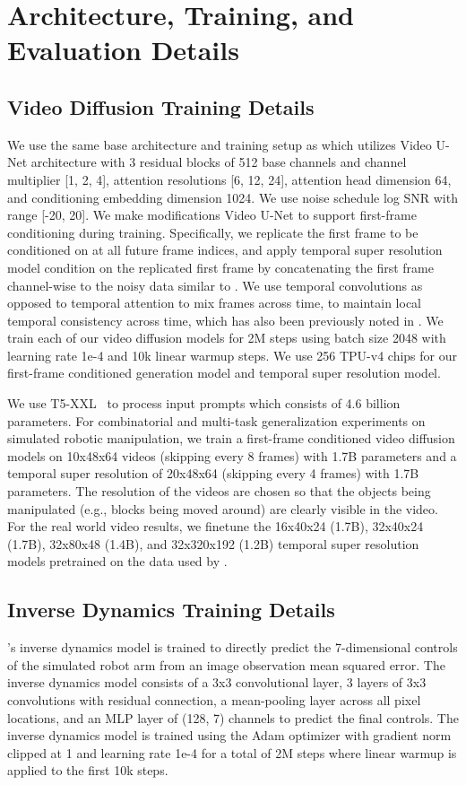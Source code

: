 \newpage
\appendix
\onecolumn
\section{Architecture, Training, and Evaluation Details}
\label{app:details}
\subsection{Video Diffusion Training Details}
We use the same base architecture and training setup as \citet{ho2022video} which utilizes Video U-Net architecture with 3 residual blocks of 512 base channels and channel multiplier [1, 2, 4], attention resolutions [6, 12, 24], attention head dimension 64, and conditioning embedding dimension 1024. We use noise schedule log SNR with range [-20, 20]. We make modifications Video U-Net to support first-frame conditioning during training. Specifically, we replicate the first frame to be conditioned on at all future frame indices, and apply temporal super resolution model condition on the replicated first frame by concatenating the first frame channel-wise to the noisy data similar to \citet{saharia2022photorealistic}. We use temporal convolutions as opposed to temporal attention to mix frames across time, to maintain local temporal consistency across time, which has also been previously noted 
 in \citet{ho2022imagen}. We train each of our video diffusion models for 2M steps using batch size 2048 with learning rate 1e-4 and 10k linear warmup steps. We use 256 TPU-v4 chips for our first-frame conditioned generation model and temporal super resolution model.

We use T5-XXL~\citep{raffel2020exploring} to process input prompts which consists of 4.6 billion parameters. For combinatorial and multi-task generalization experiments on simulated robotic manipulation, we train a first-frame conditioned video diffusion models on 10x48x64 videos (skipping every 8 frames) with 1.7B parameters and a temporal super resolution of 20x48x64 (skipping every 4 frames) with 1.7B parameters. The resolution of the videos are chosen so that the objects being manipulated (e.g., blocks being moved around) are clearly visible in the video. For the real world video results, we finetune the 16x40x24 (1.7B), 32x40x24 (1.7B), 32x80x48 (1.4B), and 32x320x192 (1.2B) temporal super resolution models pretrained on the data used by \citet{ho2022imagen}.

\subsection{Inverse Dynamics Training Details} \model's inverse dynamics model is trained to directly predict the 7-dimensional controls of the simulated robot arm from an image observation mean squared error. The inverse dynamics model consists of a 3x3 convolutional layer, 3 layers of 3x3 convolutions with residual connection, a mean-pooling layer across all pixel locations, and an MLP layer of (128, 7) channels to predict the final controls. The inverse dynamics  model is trained using the Adam optimizer with gradient norm clipped at 1 and learning rate 1e-4 for a total of 2M steps where linear warmup is applied to the first 10k steps.

